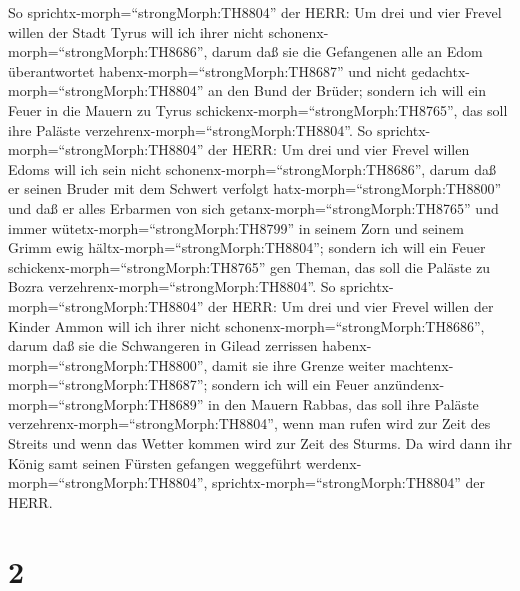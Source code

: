 So sprichtx-morph=``strongMorph:TH8804'' der HERR: Um drei und vier
Frevel willen der Stadt Tyrus will ich ihrer nicht
schonenx-morph=``strongMorph:TH8686'', darum daß sie die Gefangenen alle
an Edom überantwortet habenx-morph=``strongMorph:TH8687'' und nicht
gedachtx-morph=``strongMorph:TH8804'' an den Bund der Brüder;
 sondern ich will ein Feuer in die Mauern zu Tyrus
schickenx-morph=``strongMorph:TH8765'', das soll ihre Paläste
verzehrenx-morph=``strongMorph:TH8804''.  So
sprichtx-morph=``strongMorph:TH8804'' der HERR: Um drei und vier Frevel
willen Edoms will ich sein nicht schonenx-morph=``strongMorph:TH8686'',
darum daß er seinen Bruder mit dem Schwert verfolgt
hatx-morph=``strongMorph:TH8800'' und daß er alles Erbarmen von sich
getanx-morph=``strongMorph:TH8765'' und immer
wütetx-morph=``strongMorph:TH8799'' in seinem Zorn und seinem Grimm ewig
hältx-morph=``strongMorph:TH8804'';  sondern ich will ein
Feuer schickenx-morph=``strongMorph:TH8765'' gen Theman, das soll die
Paläste zu Bozra verzehrenx-morph=``strongMorph:TH8804''. 
So sprichtx-morph=``strongMorph:TH8804'' der HERR: Um drei und vier
Frevel willen der Kinder Ammon will ich ihrer nicht
schonenx-morph=``strongMorph:TH8686'', darum daß sie die Schwangeren in
Gilead zerrissen habenx-morph=``strongMorph:TH8800'', damit sie ihre
Grenze weiter machtenx-morph=``strongMorph:TH8687''; 
sondern ich will ein Feuer anzündenx-morph=``strongMorph:TH8689'' in den
Mauern Rabbas, das soll ihre Paläste
verzehrenx-morph=``strongMorph:TH8804'', wenn man rufen wird zur Zeit
des Streits und wenn das Wetter kommen wird zur Zeit des Sturms.
 Da wird dann ihr König samt seinen Fürsten gefangen
weggeführt werdenx-morph=``strongMorph:TH8804'',
sprichtx-morph=``strongMorph:TH8804'' der HERR.

\hypertarget{section-1}{%
\section{2}\label{section-1}}

